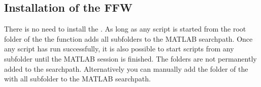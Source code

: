 \subsection{Installation of the FFW}
\label{sect:QuickStart:installation}
There is no need to install the \FFW\!.
As long as any script is started from the root folder of the \FFW\! the function 
adds all subfolders to the MATLAB searchpath. Once any script has run  successfully, it is also possible
to start scripts from any subfolder until the MATLAB session is finished. The folders are not permanently added
to the searchpath. Alternatively you can manually add the folder of the \FFW\! with all subfolder to the MATLAB searchpath.